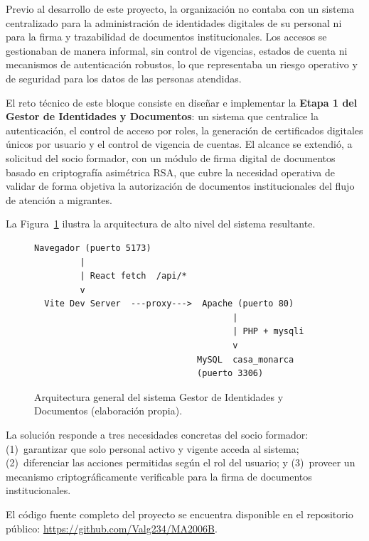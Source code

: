 \documentclass[10pt,letterpaper]{report}
\begin{document}
Previo al desarrollo de este proyecto, la organización no contaba con un sistema centralizado para la administración de identidades digitales de su personal ni para la firma y trazabilidad de documentos institucionales. Los accesos se gestionaban de manera informal, sin control de vigencias, estados de cuenta ni mecanismos de autenticación robustos, lo que representaba un riesgo operativo y de seguridad para los datos de las personas atendidas.

El reto técnico de este bloque consiste en diseñar e implementar la \textbf{Etapa 1 del Gestor de Identidades y Documentos}: un sistema que centralice la autenticación, el control de acceso por roles, la generación de certificados digitales únicos por usuario y el control de vigencia de cuentas. El alcance se extendió, a solicitud del socio formador, con un módulo de firma digital de documentos basado en criptografía asimétrica RSA, que cubre la necesidad operativa de validar de forma objetiva la autorización de documentos institucionales del flujo de atención a migrantes.

La Figura~\ref{fig:arquitectura-general} ilustra la arquitectura de alto nivel del sistema resultante.

\begin{figure}[htbp]
\centering
\begin{Verbatim}[frame=single,rulecolor=\color{gray!40},fontsize=\small]
  Navegador (puerto 5173)
         |
         | React fetch  /api/*
         v
  Vite Dev Server  ---proxy--->  Apache (puerto 80)
                                       |
                                       | PHP + mysqli
                                       v
                                MySQL  casa_monarca
                                (puerto 3306)
\end{Verbatim}
\caption{Arquitectura general del sistema Gestor de Identidades y Documentos (elaboración propia).}
\label{fig:arquitectura-general}
\end{figure}

La solución responde a tres necesidades concretas del socio formador: (1)~garantizar que solo personal activo y vigente acceda al sistema; (2)~diferenciar las acciones permitidas según el rol del usuario; y (3)~proveer un mecanismo criptográficamente verificable para la firma de documentos institucionales.

El código fuente completo del proyecto se encuentra disponible en el repositorio público: \url{https://github.com/Valg234/MA2006B}.
\end{document}
